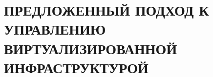 \section[ПРЕДЛОЖЕННЫЙ ПОДХОД К УПРАВЛЕНИЮ \\ ВИРТУАЛИЗИРОВАННОЙ ИНФРАСТРУКТУРОЙ]{ПРЕДЛОЖЕННЫЙ ПОДХОД К УПРАВЛЕНИЮ \\ ВИРТУАЛИЗИРОВАННОЙ \\ ИНФРАСТРУКТУРОЙ}

